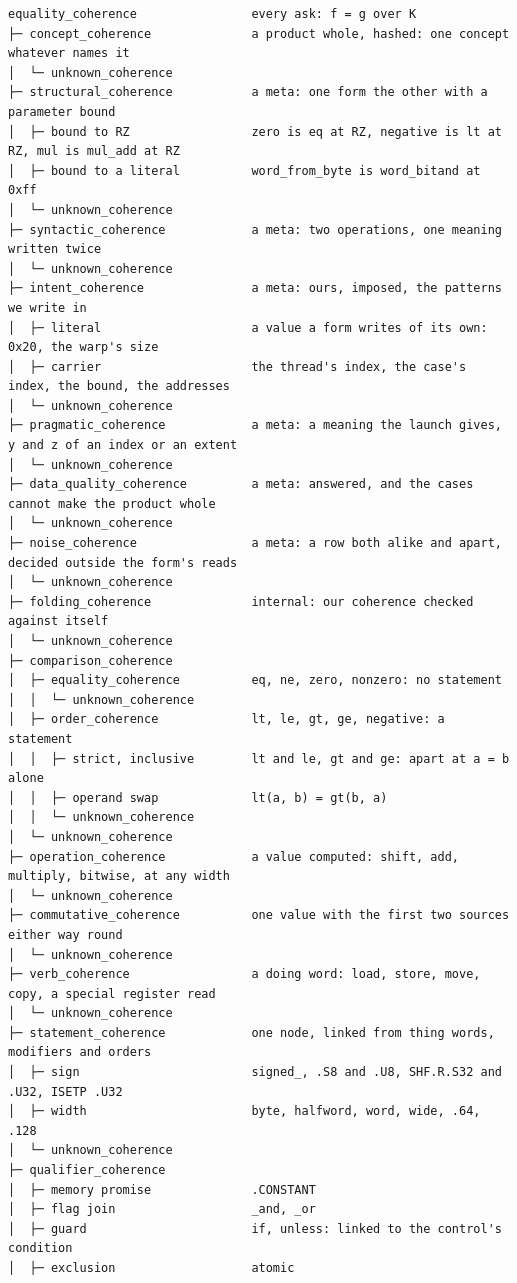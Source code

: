 \begin{Verbatim}
equality_coherence                every ask: f = g over K
├─ concept_coherence              a product whole, hashed: one concept whatever names it
│  └─ unknown_coherence
├─ structural_coherence           a meta: one form the other with a parameter bound
│  ├─ bound to RZ                 zero is eq at RZ, negative is lt at RZ, mul is mul_add at RZ
│  ├─ bound to a literal          word_from_byte is word_bitand at 0xff
│  └─ unknown_coherence
├─ syntactic_coherence            a meta: two operations, one meaning written twice
│  └─ unknown_coherence
├─ intent_coherence               a meta: ours, imposed, the patterns we write in
│  ├─ literal                     a value a form writes of its own: 0x20, the warp's size
│  ├─ carrier                     the thread's index, the case's index, the bound, the addresses
│  └─ unknown_coherence
├─ pragmatic_coherence            a meta: a meaning the launch gives, y and z of an index or an extent
│  └─ unknown_coherence
├─ data_quality_coherence         a meta: answered, and the cases cannot make the product whole
│  └─ unknown_coherence
├─ noise_coherence                a meta: a row both alike and apart, decided outside the form's reads
│  └─ unknown_coherence
├─ folding_coherence              internal: our coherence checked against itself
│  └─ unknown_coherence
├─ comparison_coherence
│  ├─ equality_coherence          eq, ne, zero, nonzero: no statement
│  │  └─ unknown_coherence
│  ├─ order_coherence             lt, le, gt, ge, negative: a statement
│  │  ├─ strict, inclusive        lt and le, gt and ge: apart at a = b alone
│  │  ├─ operand swap             lt(a, b) = gt(b, a)
│  │  └─ unknown_coherence
│  └─ unknown_coherence
├─ operation_coherence            a value computed: shift, add, multiply, bitwise, at any width
│  └─ unknown_coherence
├─ commutative_coherence          one value with the first two sources either way round
│  └─ unknown_coherence
├─ verb_coherence                 a doing word: load, store, move, copy, a special register read
│  └─ unknown_coherence
├─ statement_coherence            one node, linked from thing words, modifiers and orders
│  ├─ sign                        signed_, .S8 and .U8, SHF.R.S32 and .U32, ISETP .U32
│  ├─ width                       byte, halfword, word, wide, .64, .128
│  └─ unknown_coherence
├─ qualifier_coherence
│  ├─ memory promise              .CONSTANT
│  ├─ flag join                   _and, _or
│  ├─ guard                       if, unless: linked to the control's condition
│  ├─ exclusion                   atomic

\end{Verbatim}
